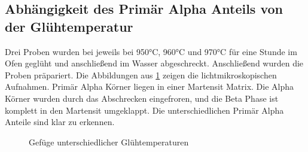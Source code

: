 \documentclass[a4paper, 11pt]{tubsreprt}
\begin{document}
\subsection{Abhängigkeit des Primär Alpha Anteils von der Glühtemperatur}
Drei Proben wurden bei jeweils bei 950°C, 960°C und 970°C für eine Stunde im Ofen geglüht und anschließend im Wasser abgeschreckt. Anschließend wurden die Proben präpariert. Die Abbildungen aus \ref{Alle Glühen} zeigen die lichtmikroskopischen Aufnahmen. Primär Alpha Körner liegen in einer Martensit Matrix. Die Alpha Körner wurden durch das Abschrecken eingefroren, und die Beta Phase ist komplett in den Martensit umgeklappt. Die unterschiedlichen Primär Alpha Anteile sind klar zu erkennen.

\begin{figure}
\caption{Gefüge unterschiedlicher Glühtemperaturen}
\label{Alle Glühen}
\end{figure}
\end{document}
